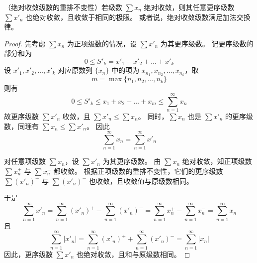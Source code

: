 \begin{theorem}
	（绝对收敛级数的重排不变性）若级数 $\sum x_n$ 绝对收敛，则其任意更序级数 $\sum x'_n$ 也绝对收敛，且收敛于相同的极限。
	或者说，绝对收敛级数满足加法交换律。
\end{theorem}
\begin{proof}
	先考虑 $\sum x_n$ 为正项级数的情况，设 $\sum x'_n$ 为其更序级数。
	记更序级数的部分和为
	\[
	0 \le S'_k = x'_1 + x'_2 + \dots + x'_k
	\]
	设 $x'_1, x'_2, \dots, x'_k$ 对应原数列 $\{x_n\}$ 中的项为 $x_{n_1}, x_{n_2}, \dots, x_{n_k}$，取
	\[
	m = \max\{n_1, n_2, \dots, n_k\}
	\]
	则有
	\[
	0 \le S'_k \le x_1 + x_2 + \dots + x_m \le \sum_{n=1}^{\infty} x_n
	\]
	故更序级数 $\sum x'_n$ 收敛，且 $\sum x'_n \le \sum x_n$。
	同时，$\sum x_n$ 也是 $\sum x'_n$ 的更序级数，同理有 $\sum x_n \le \sum x'_n$。
	因此
	\[
	\sum_{n=1}^{\infty} x_n = \sum_{n=1}^{\infty} x'_n
	\]
	
	对任意项级数 $\sum x_n$，设 $\sum x'_n$ 为其更序级数。
	由 $\sum x_n$ 绝对收敛，知正项级数 $\sum x_n^+$ 与 $\sum x_n^-$ 都收敛。
	根据正项级数的重排不变性，它们的更序级数 $\sum (x'_n)^+$ 与 $\sum (x'_n)^-$ 也收敛，且收敛值与原级数相同。
	
	于是
	\[
	\sum_{n=1}^{\infty} x'_n = \sum_{n=1}^{\infty} (x'_n)^+ - \sum_{n=1}^{\infty} (x'_n)^- = \sum_{n=1}^{\infty} x_n^+ - \sum_{n=1}^{\infty} x_n^- = \sum_{n=1}^{\infty} x_n
	\]
	且
	\[
	\sum_{n=1}^{\infty} |x'_n| = \sum_{n=1}^{\infty} (x'_n)^+ + \sum_{n=1}^{\infty} (x'_n)^- = \sum_{n=1}^{\infty} |x_n|
	\]
	因此，更序级数 $\sum x'_n$ 也绝对收敛，且和与原级数相同。
	
\end{proof}
 
